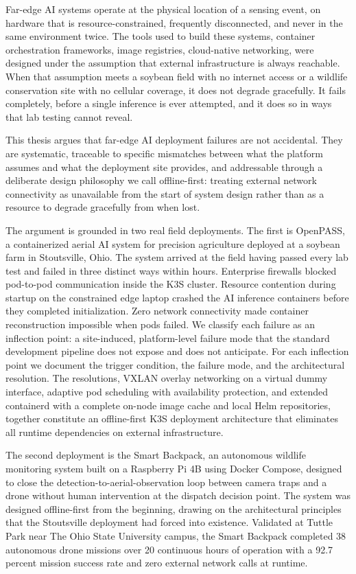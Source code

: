 
Far-edge AI systems operate at the physical location of a sensing event, on hardware that is resource-constrained, frequently disconnected, and never in the same environment twice. The tools used to build these systems, container orchestration frameworks, image registries, cloud-native networking, were designed under the assumption that external infrastructure is always reachable. When that assumption meets a soybean field with no internet access or a wildlife conservation site with no cellular coverage, it does not degrade gracefully. It fails completely, before a single inference is ever attempted, and it does so in ways that lab testing cannot reveal.

This thesis argues that far-edge AI deployment failures are not accidental. They are systematic, traceable to specific mismatches between what the platform assumes and what the deployment site provides, and addressable through a deliberate design philosophy we call offline-first: treating external network connectivity as unavailable from the start of system design rather than as a resource to degrade gracefully from when lost.

The argument is grounded in two real field deployments. The first is OpenPASS, a containerized aerial AI system for precision agriculture deployed at a soybean farm in Stoutsville, Ohio. The system arrived at the field having passed every lab test and failed in three distinct ways within hours. Enterprise firewalls blocked pod-to-pod communication inside the K3S cluster. Resource contention during startup on the constrained edge laptop crashed the AI inference containers before they completed initialization. Zero network connectivity made container reconstruction impossible when pods failed. We classify each failure as an inflection point: a site-induced, platform-level failure mode that the standard development pipeline does not expose and does not anticipate. For each inflection point we document the trigger condition, the failure mode, and the architectural resolution. The resolutions, VXLAN overlay networking on a virtual dummy interface, adaptive pod scheduling with availability protection, and extended containerd with a complete on-node image cache and local Helm repositories, together constitute an offline-first K3S deployment architecture that eliminates all runtime dependencies on external infrastructure.

The second deployment is the Smart Backpack, an autonomous wildlife monitoring system built on a Raspberry Pi 4B using Docker Compose, designed to close the detection-to-aerial-observation loop between camera traps and a drone without human intervention at the dispatch decision point. The system was designed offline-first from the beginning, drawing on the architectural principles that the Stoutsville deployment had forced into existence. Validated at Tuttle Park near The Ohio State University campus, the Smart Backpack completed 38 autonomous drone missions over 20 continuous hours of operation with a 92.7 percent mission success rate and zero external network calls at runtime.

